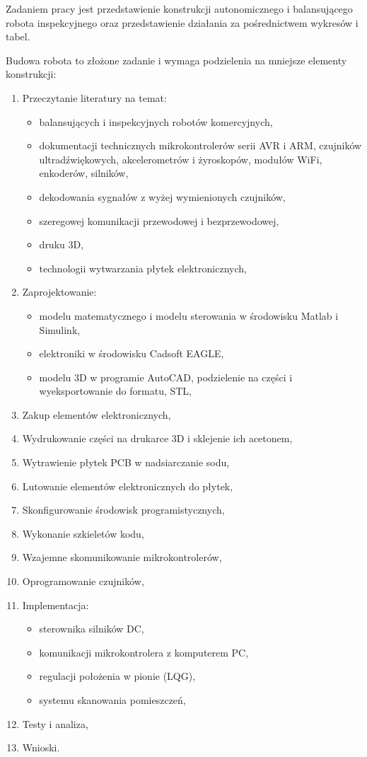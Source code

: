\documentclass[a4paper,12pt,twoside,openany]{report}
\begin{document}
Zadaniem pracy jest przedstawienie konstrukcji autonomicznego i balansującego robota inspekcyjnego oraz przedstawienie działania za pośrednictwem wykresów i tabel.

Budowa robota to złożone zadanie i wymaga podzielenia na mniejsze elementy konstrukcji:
\begin{enumerate}
	\item Przeczytanie literatury na temat: 
    \begin{itemize}
    	\item balansujących i inspekcyjnych robotów komercyjnych, 
        \item dokumentacji technicznych mikrokontrolerów serii AVR i ARM, czujników ultradźwiękowych, akcelerometrów i żyroskopów, modułów WiFi, enkoderów, silników,
        \item dekodowania sygnałów z wyżej wymienionych czujników,
        \item szeregowej komunikacji przewodowej i bezprzewodowej,
        \item druku 3D,
        \item technologii wytwarzania płytek elektronicznych,
    \end{itemize}
	\item Zaprojektowanie:
    	\begin{itemize}
    		\item modelu matematycznego i modelu sterowania w środowisku Matlab i Simulink,
        	\item elektroniki w środowisku Cadsoft EAGLE,
        	\item modelu 3D w programie AutoCAD, podzielenie na części i wyeksportowanie do formatu, STL,
    	\end{itemize}
    \item Zakup elementów elektronicznych,
	\item Wydrukowanie części na drukarce 3D i sklejenie ich acetonem,
	\item Wytrawienie płytek PCB w nadsiarczanie sodu,
	\item Lutowanie elementów elektronicznych do płytek,
	\item Skonfigurowanie środowisk programistycznych,
    \item Wykonanie szkieletów kodu,
    \item Wzajemne skomunikowanie mikrokontrolerów,
    \item Oprogramowanie czujników,
    \item Implementacja:
    	\begin{itemize}
    		\item sterownika silników DC,
        	\item komunikacji mikrokontrolera z komputerem PC,
        	\item regulacji położenia w pionie (LQG),
            \item systemu skanowania pomieszczeń,
    	\end{itemize}
    \item Testy i analiza,
    \item Wnioski.
\end{enumerate}
\end{document}
